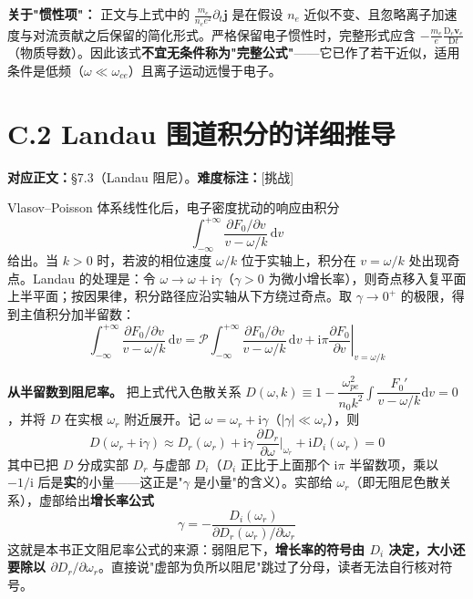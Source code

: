 \documentclass[12pt,a4paper,openany,oneside]{book}
\newcommand{\diff}{\mathrm{d}}
\newcommand{\ii}{\mathrm{i}}
\newcommand{\vect}[1]{\bm{#1}}
\begin{document}
\textbf{关于"惯性项"：} 正文与上式中的 $\frac{m_e}{n_ee^2}\partial_t\vect{j}$ 是在假设 $n_e$ 近似不变、且忽略离子加速度与对流贡献之后保留的简化形式。严格保留电子惯性时，完整形式应含 $-\frac{m_e}{e}\frac{\mathrm{D}_e\vect{v}_e}{\mathrm{D}t}$（物质导数）。因此该式\textbf{不宜无条件称为"完整公式"}——它已作了若干近似，适用条件是低频（$\omega\ll\omega_{ce}$）且离子运动远慢于电子。


\section{C.2 Landau 围道积分的详细推导}
\label{sec:landau-contour}

\textbf{对应正文：}\S 7.3（Landau 阻尼）。\textbf{难度标注：}[挑战]

Vlasov--Poisson 体系线性化后，电子密度扰动的响应由积分
\begin{equation}
\int_{-\infty}^{+\infty} \frac{\partial F_0/\partial v}{v-\omega/k}\,\diff v
\label{eq:ch7-landau-integral}
\end{equation}
给出。当 $k>0$ 时，若波的相位速度 $\omega/k$ 位于实轴上，积分在 $v=\omega/k$ 处出现奇点。Landau 的处理是：令 $\omega\to\omega+\ii\gamma$（$\gamma>0$ 为微小增长率），则奇点移入复平面上半平面；按因果律，积分路径应沿实轴从下方绕过奇点。取 $\gamma\to 0^+$ 的极限，得到主值积分加半留数：
\begin{equation}
\int_{-\infty}^{+\infty} \frac{\partial F_0/\partial v}{v-\omega/k}\,\diff v
= \mathcal{P}\int_{-\infty}^{+\infty} \frac{\partial F_0/\partial v}{v-\omega/k}\,\diff v
+ \ii\pi\left.\frac{\partial F_0}{\partial v}\right|_{v=\omega/k}
\label{eq:ch7-landau-contour}
\end{equation}

\textbf{从半留数到阻尼率。} 把上式代入色散关系 $D(\omega,k)\equiv 1-\dfrac{\omega_{pe}^2}{n_0k^2}\displaystyle\int\dfrac{F_0'}{v-\omega/k}\diff v=0$，并将 $D$ 在实根 $\omega_r$ 附近展开。记 $\omega=\omega_r+\ii\gamma$（$|\gamma|\ll\omega_r$），则
\[
D(\omega_r+\ii\gamma) \approx D_r(\omega_r) + \ii\gamma\,\frac{\partial D_r}{\partial\omega}\Big|_{\omega_r} + \ii D_i(\omega_r) = 0
\]
其中已把 $D$ 分成实部 $D_r$ 与虚部 $D_i$（$D_i$ 正比于上面那个 $\ii\pi$ 半留数项，乘以 $-1/\ii$ 后是\textbf{实}的小量——这正是"$\gamma$ 是小量"的含义）。实部给 $\omega_r$（即无阻尼色散关系），虚部给出\textbf{增长率公式}
\begin{equation}
\boxed{\;\gamma = -\frac{D_i(\omega_r)}{\partial D_r(\omega_r)/\partial\omega_r}\;}
\label{eq:ch7-growth-rate}
\end{equation}
这就是本书正文阻尼率公式的来源：弱阻尼下，\textbf{增长率的符号由 $D_i$ 决定，大小还要除以 $\partial D_r/\partial\omega_r$}。直接说"虚部为负所以阻尼"跳过了分母，读者无法自行核对符号。
\end{document}
